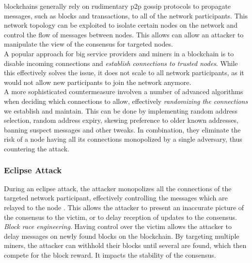 \documentclass[12pt,a4paper]{article}
\begin{document}
\Glspl{blockchain} generally rely on rudimentary \acrshort{p2p} gossip protocols to propagate messages, such as \glspl{block} and \glspl{transaction}, to all of the network participants. This network topology can be exploited to isolate certain nodes on the network and control the flow of messages between nodes. This allows can allow an attacker to manipulate the view of the \gls{consensus} for targeted nodes.\\

A popular approach for big service providers and \glspl{miner} in a \gls{blockchain} is to disable incoming connections and \textit{establish connections to trusted \glspl{node}}. While this effectively solves the issue, it does not scale to all network participants, as it would not allow new participants to join the network anymore.\\

A more sophisticated countermeasure involven a number of advanced algorithms when deciding which connections to allow, effectively \textit{randomizing the connections} we establish and maintain. This can be done by implementing random address selection, random address expiry, skewing preference to older known addresses, banning suspect messages and other tweaks. In combination, they eliminate the risk of a \gls{node} having all its connections monopolized by a single adversary, thus countering the attack.\\

\subsubsection{Eclipse Attack}

During an eclipse attack, the attacker monopolizes all the connections of the targeted network participant, effectively controlling the messages which are relayed to the \gls{node} \cite{eclipse}. This allows the attacker to present an inaccurate picture of the \gls{consensus} to the victim, or to delay reception of updates to the \gls{consensus}.\\

\textit{Block race engineering}. Having control over the victim allows the attacker to delay messages on newly found \glspl{block} on the \gls{blockchain}. By targeting multiple \glspl{miner}, the attacker can withhold their blocks until several are found, which then compete for the block reward. It impacts the stability of the \gls{consensus}.\\
\end{document}
